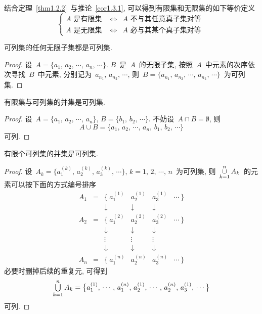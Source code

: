 结合定理~\ref{thm1.2.2}~与推论~\ref{cor1.3.1}, 可以得到有限集和无限集的如下等价定义
\[
\left\{\!\!
\begin{array}{lcl}
A \mbox{~是有限集~} & \Longleftrightarrow & A \mbox{~不与其任意真子集对等~} \\
A \mbox{~是无限集~} & \Longleftrightarrow & A \mbox{~必与其某个真子集对等~}
\end{array}
\right.
\]

\begin{proposition} \label{thm1.3.2}
可列集的任何无限子集都是可列集.
\end{proposition}

\begin{proof}
设~$A = \{a_1, \, a_2, \, \cdots, \, a_n, \, \cdots\}$. $B$~是~$A$~的无限子集, 按照~$A$~中元素的次序依次寻找~$B$~中元素, 分别记为~$a_{n_1},\, a_{n_2}, \, \cdots$, 则~$B = \{a_{n_1}, \, a_{n_2}, \, \cdots, \, a_{n_k}, \, \cdots\}$~为可列集.
\end{proof}

\begin{proposition} \label{thm1.3.4}
有限集与可列集的并集是可列集.
\end{proposition}

\begin{proof}
设~$A = \{a_1, \, a_2, \, \cdots, \, a_n\}, \, B = \{b_1, \, b_2, \, \cdots\}$. 不妨设~$A \cap B = \emptyset$, 则
\[
A \cup B = \{a_1, \, a_2, \, \cdots, \, a_n, \, b_1, \, b_2, \, \cdots\}
\]
可列.
\end{proof}

\begin{proposition} \label{thm1.3.5}
有限个可列集的并集是可列集.
\end{proposition}

\begin{proof}
设~$A_k = \{a_1 ^{(k)}, \, a_2 ^{(k)}, \, a_3 ^{(k)}, \, \cdots\}, \, k = 1,\,2,\, \cdots, \,n$~为可列集, 则~$\mathop{\cup} \limits_{k=1} ^n A_k$~的元素可以按下面的方式编号排序
\[
\begin{array}{cccccc}
A_1 & = & \{~a_1 ^{(1)} & a_2 ^{(1)} & a_3 ^{(1)} & \cdots~\} \\
    &   &   \downarrow  & \downarrow & \downarrow &           \\
A_2 & = & \{~a_1 ^{(2)} & a_2 ^{(2)} & a_3 ^{(2)} & \cdots~\} \\
    &   &   \downarrow  & \downarrow & \downarrow &           \\
    &   &   \vdots      &    \vdots  &    \vdots  &           \\
    &   &   \downarrow  & \downarrow & \downarrow &           \\
A_n & = & \{~a_1 ^{(n)} & a_2 ^{(n)} & a_3 ^{(n)} & \cdots~\}
\end{array}
\]
必要时删掉后续的重复元, 可得到
\[
\mathop{\textstyle{\bigcup}} \limits_{k=1} ^n A_k = \big\{a_1 ^{(1)}, \, \cdots, \, a_1 ^{(n)}, \, a_2 ^{(1)}, \, \cdots, \, a_2 ^{(n)}, \, a_3 ^{(1)}, \, \cdots\big\}
\]
可列.
\end{proof}

